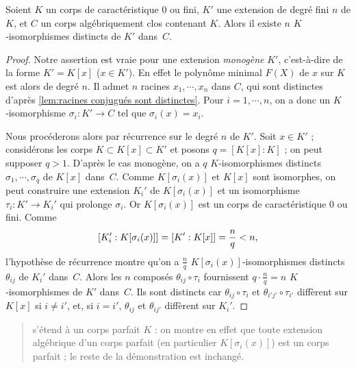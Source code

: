 \documentclass[11pt, useosf,
  title in boldface,
  theorem in new line,
  theorem numbering = section,
  number theorems separately,
]{simplivre}
\begin{document}
    \begin{theorem}\label{thm:nombre de prolongements et degré}
        Soient \( K \) un corps de caractéristique \( 0 \) ou fini, \( K' \) une extension de degré fini \( n \) de \( K \), et \( C \) un corps algébriquement clos contenant \( K \). Alors il existe \( n \) \( K \)‑isomorphismes distincts de \( K' \) dans~\( C \).
    \end{theorem}
    \begin{proof}
        Notre assertion est vraie pour une extension \emph{monogène} \( K' \), c'est-à-dire de la forme \( K' = K[x] \) (\( x \in K' \)). En effet le polynôme minimal \( F(X) \) de \( x \) sur \( K \) est alors de degré \( n \). Il admet \( n \) racines \( x_1, \cdots, x_n \) dans \( C \), qui sont distinctes d'après \cref{lem:racines conjugués sont distinctes}. Pour \( i = 1, \cdots, n \), on a donc un \( K \)‑isomorphisme \( \sigma_i \colon K' \to C \) tel que \( \sigma_i(x) = x_i \).

        Nous procéderons alors par récurrence sur le degré \( n \) de \( K' \). Soit \( x \in K' \) ;  considérons les corps \( K \subset K[x] \subset K' \) et posons \( q = [K[x]:K] \) ; on peut supposer \( q > 1 \). D'après le cas monogène, on a \( q \) \( K \)‑isomorphismes distincts \( \sigma_1, \cdots, \sigma_q \) de \( K[x] \) dans~\( C \). Comme \( K[\sigma_i(x)] \) et \( K[x] \) sont isomorphes, on peut construire une extension \( K_i' \) de \( K[\sigma_i(x)] \) et un isomorphisme \( \tau_i \colon K' \to K_i' \) qui prolonge \( \sigma_i \). Or \( K[\sigma_i(x)] \) est un corps de caractéristique \( 0 \) ou fini. Comme
        {\[\setlength{\abovedisplayskip}{.5\baselineskip}%
        \setlength{\belowdisplayskip}{.5\baselineskip}%
            [K_i' : K[\sigma_i(x)]] = [K' : K[x]] = \frac{n}{q} < n,
        \]}%
        l'hypothèse de récurrence montre qu'on a \( \frac{n}{q} \) \( K[\sigma_i(x)] \)‑isomorphismes distincts \( \theta_{ij} \) de \( K_i' \) dans~\( C \). Alors les \( n \) composés \( \theta_{ij} \circ \tau_i \) fournissent \( q \cdot \frac{n}{q} = n \) \( K \)‑isomorphismes de \( K' \) dans~\( C \). Ils sont distincts car \( \theta_{ij} \circ \tau_i \) et \( \theta_{i'j'} \circ \tau_{i'} \) diffèrent sur \( K[x] \) si \( i \neq i' \), et, si \( i = i' \), \( \theta_{ij} \) et \( \theta_{ij'} \) diffèrent sur \( K_i' \).
    \end{proof}

    \begin{quote}
         s'étend à un corps parfait \( K \) : on montre en effet que toute extension algébrique d'un corps parfait (en particulier \( K[\sigma_i(x)] \)) est un corps parfait ; le reste de la démonstration est inchangé.
    \end{quote}
\end{document}
